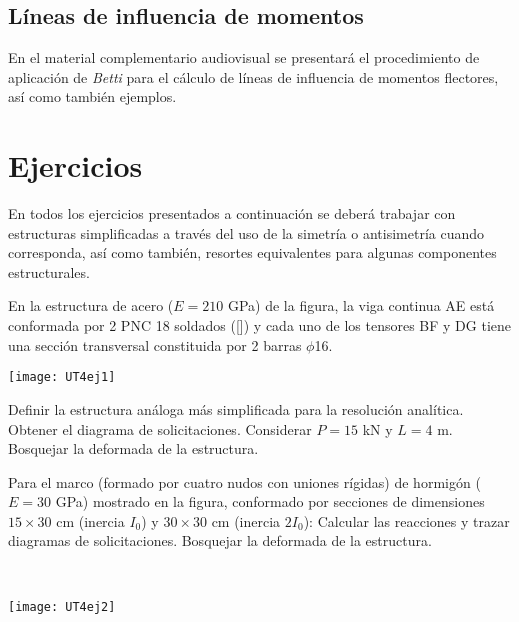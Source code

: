 \subsection{Líneas de influencia de momentos}

En el material complementario audiovisual se presentará el procedimiento de aplicación de \textit{Betti} para el cálculo de líneas de influencia de momentos flectores, así como también ejemplos.


\section{Ejercicios}
\setcounter{ejercicio}{0}

En todos los ejercicios presentados a continuación se deberá trabajar con estructuras simplificadas a través del uso de la simetría o antisimetría cuando corresponda, así como también, resortes equivalentes para algunas componentes estructurales. %
%

\ejercicio 

En la estructura de acero ($E=210$ GPa) de la figura, la viga continua AE está conformada por 2 PNC 18 soldados ([]) y cada uno de los tensores BF y DG tiene una sección transversal constituida por 2 barras $\phi$16. 

\begin{center}
	\texttt{[image: UT4ej1]}
\end{center}

\parte Definir la estructura análoga más simplificada para la resolución analítica.
\parte Obtener el diagrama de solicitaciones. Considerar $P=15$ kN y $L= 4$ m.
\parte Bosquejar la deformada de la estructura.




\ejercicio

\begin{minipage}[b]{0.58\textwidth}
%
Para el marco (formado por cuatro nudos con uniones rígidas) de hormigón ($E=30$ GPa) mostrado en la figura, conformado por secciones de dimensiones $15 \times 30$ cm (inercia $I_0$) y $30\times 30$ cm (inercia $2 I_0$):
%
\parte Calcular las reacciones y trazar diagramas de solicitaciones.
\parte Bosquejar la deformada de la estructura.
\end{minipage}
~
\begin{minipage}{0.4\textwidth}
\begin{center}
	\texttt{[image: UT4ej2]}
\end{center}
\end{minipage}




